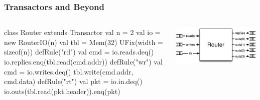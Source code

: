 \documentclass[xcolor=pdflatex,dvipsnames,table]{beamer}
\begin{document}
\begin{frame}[fragile]
\frametitle{Transactors and Beyond}
\begin{columns}
{
\begin{scala}
class Router extends Transactor {
  val n   = 2
  val io  = new RouterIO(n)
  val tbl = Mem(32){ UFix(width = sizeof(n)) }
  defRule("rd") { 
    val cmd = io.reads.deq()  
    io.replies.enq(tbl.read(cmd.addr)) 
  }
  defRule("wr") { 
    val cmd = io.writes.deq()
    tbl.write(cmd.addr, cmd.data) 
  }
  defRule("rt") { 
    val pkt = io.in.deq()
    io.outs(tbl.read(pkt.header)).enq(pkt) 
  }
}
\end{scala}
}
\includegraphics[width=0.99\textwidth]{figs/trouter.pdf} 
\end{columns}

\end{frame}

% 
% 
\end{document}
